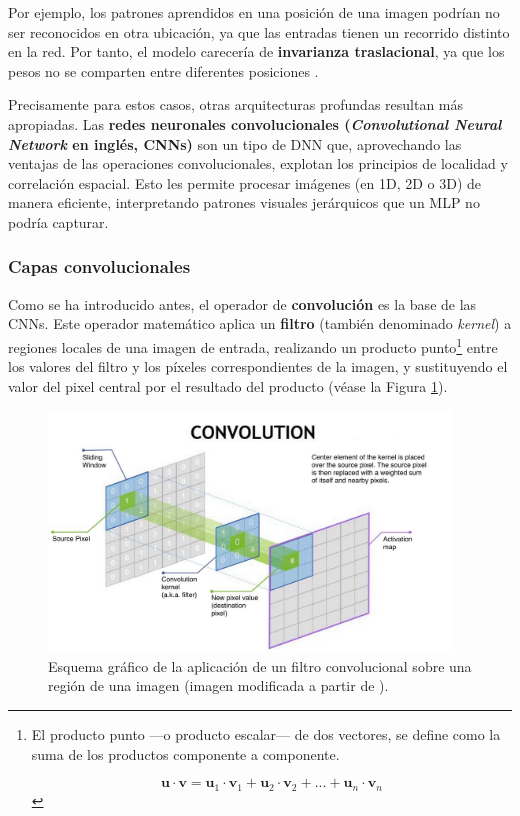 Por ejemplo, los patrones aprendidos en una posición de una imagen podrían no ser reconocidos en otra 
ubicación, ya que las entradas tienen un recorrido distinto en la red. Por tanto, el modelo carecería de           %
\textbf{invarianza traslacional}, ya que los pesos no se comparten entre diferentes posiciones 
\cite{murphy2022}.

Precisamente para estos casos, otras arquitecturas profundas resultan más apropiadas.
Las \textbf{redes neuronales convolucionales (\textit{Convolutional Neural Network} en inglés, CNNs)} son un 
tipo de DNN que, aprovechando las ventajas de las operaciones convolucionales, explotan los principios de 
localidad y correlación espacial. Esto les permite procesar imágenes (en 1D, 2D o 3D) de manera eficiente, 
interpretando patrones visuales jerárquicos que un MLP no podría capturar.


\subsubsection{Capas convolucionales}

Como se ha introducido antes, el operador de \textbf{convolución} es la base de las CNNs. Este operador 
matemático aplica un \textbf{filtro} (también denominado \textit{kernel}) a regiones locales de una imagen de 
entrada, realizando un producto punto\footnote{El producto punto ---o producto escalar--- de dos vectores, se 
define como la suma de los productos componente a componente. 

$$
\mathbf{u} \cdot \mathbf{v} = \mathbf{u}_1 \cdot \mathbf{v}_1 + \mathbf{u}_2 \cdot \mathbf{v}_2 + ... + 
\mathbf{u}_n \cdot \mathbf{v}_n
$$
} 
entre los valores del filtro y los píxeles correspondientes de la imagen, y sustituyendo el valor del pixel 
central por el resultado del producto (véase la Figura \ref{fig:conv_op}).

\begin{figure}[h]
    \centering
    \includegraphics[width=0.95\textwidth]{capitulos/cap_02/imagenes/convolution_operation.jpg}
    \caption{
        Esquema gráfico de la aplicación de un filtro convolucional sobre una región de una imagen 
        (imagen modificada a partir de \cite{nvidia2025convolutionoperation}).
    } 
    \label{fig:conv_op}
\end{figure}

